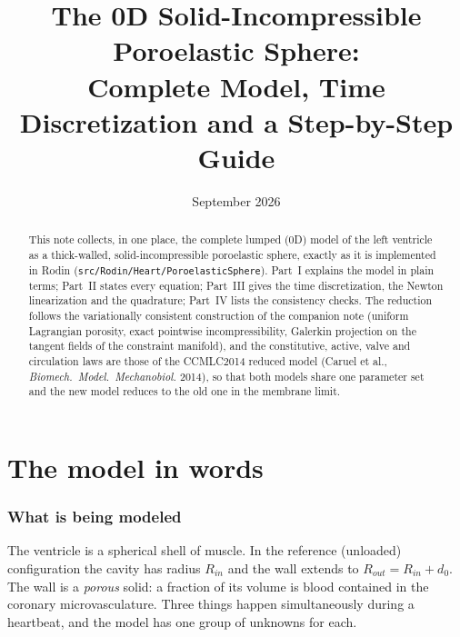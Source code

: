 \documentclass[11pt,a4paper]{article}
\title{The 0D Solid-Incompressible Poroelastic Sphere:\\ Complete Model, Time Discretization and a Step-by-Step Guide}
\author{}
\date{September 2026}
\newcommand{\Rin}{R_{in}}
\newcommand{\Rout}{R_{out}}
\newcommand{\code}[1]{\texttt{#1}}
\begin{document}
\maketitle

\begin{abstract}
This note collects, in one place, the complete lumped (0D) model of the left ventricle as a thick-walled, solid-incompressible poroelastic sphere, exactly as it is implemented in Rodin (\code{src/Rodin/Heart/PoroelasticSphere}). Part~I explains the model in plain terms; Part~II states every equation; Part~III gives the time discretization, the Newton linearization and the quadrature; Part~IV lists the consistency checks. The reduction follows the variationally consistent construction of the companion note (uniform Lagrangian porosity, exact pointwise incompressibility, Galerkin projection on the tangent fields of the constraint manifold), and the constitutive, active, valve and circulation laws are those of the CCMLC2014 reduced model (Caruel et al., \emph{Biomech.\ Model.\ Mechanobiol.} 2014), so that both models share one parameter set and the new model reduces to the old one in the membrane limit.
\end{abstract}

\tableofcontents

\part{The model in words}

\section{What is being modeled}

The ventricle is a spherical shell of muscle. In the reference (unloaded) configuration the cavity has radius $\Rin$ and the wall extends to $\Rout=\Rin+d_0$. The wall is a \emph{porous} solid: a fraction of its volume is blood contained in the coronary microvasculature. Three things happen simultaneously during a heartbeat, and the model has one group of unknowns for each.
\end{document}
